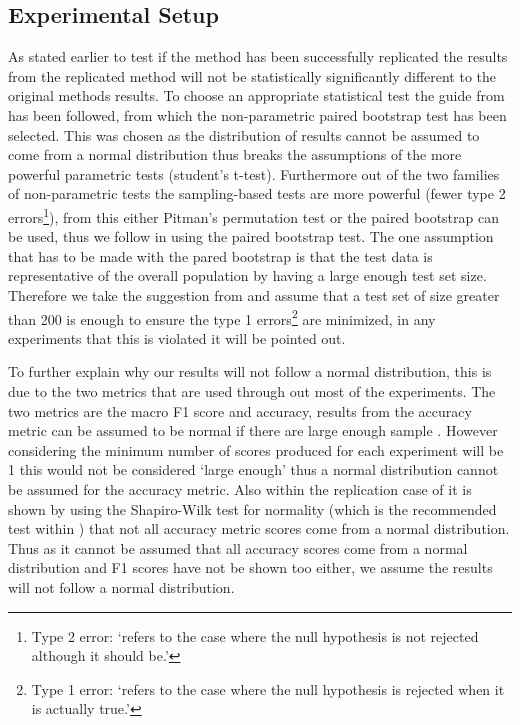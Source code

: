\subsection{Experimental Setup}
As stated earlier to test if the method has been successfully replicated the results from the replicated method will not be statistically significantly different to the original methods results. To choose an appropriate statistical test the guide from \citet{dror-etal-2018-hitchhikers} has been followed, from which the non-parametric paired bootstrap test \citep{efron_1993} has been selected. This was chosen as the distribution of results cannot be assumed to come from a normal distribution thus breaks the assumptions of the more powerful parametric tests (student's t-test). Furthermore out of the two families of non-parametric tests the sampling-based tests are more powerful \citep{dror-etal-2018-hitchhikers,sogaard-etal-2014-whats} (fewer type 2 errors\footnote{Type 2 error: `refers to the case where the null hypothesis is not rejected although it should be.'\citep{dror-etal-2018-hitchhikers}}), from this either Pitman's permutation test or the paired bootstrap can be used, thus we follow \citet{sogaard-etal-2014-whats} in using the paired bootstrap test. The one assumption that has to be made with the pared bootstrap is that the test data is representative of the overall population by having a large enough test set size. Therefore we take the suggestion from \citet{sogaard-etal-2014-whats} and assume that a test set of size greater than 200 is enough to ensure the type 1 errors\footnote{Type 1 error: `refers to the case where the null hypothesis is rejected when it is actually true.'\citep{dror-etal-2018-hitchhikers}} are minimized, in any experiments that this is violated it will be pointed out.

To further explain why our results will not follow a normal distribution, this is due to the two metrics that are used through out most of the experiments. The two metrics are the macro F1 score and accuracy, results from the accuracy metric can be assumed to be normal if there are large enough sample \citep{dror-etal-2018-hitchhikers}. However considering the minimum number of scores produced for each experiment will be 1 this would not be considered `large enough' thus a normal distribution cannot be assumed for the accuracy metric. Also within the replication case of \citet{tang-etal-2016-effective} it is shown by using the Shapiro-Wilk test \citep{shapiro1965analysis} for normality (which is the recommended test within \citet{dror-etal-2018-hitchhikers}) that not all accuracy metric scores come from a normal distribution. Thus as it cannot be assumed that all accuracy scores come from a normal distribution and F1 scores have not be shown too either, we assume the results will not follow a normal distribution.

